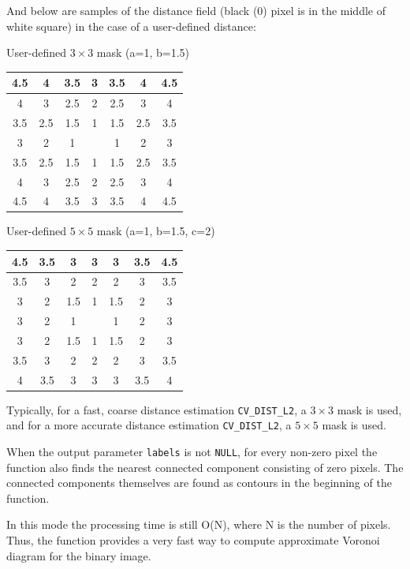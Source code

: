 And below are samples of the distance field (black (0) pixel is in the middle of white square) in the case of a user-defined distance:

User-defined $3 \times 3$ mask (a=1, b=1.5)

\begin{tabular}{| c | c | c | c | c | c | c |}
\hline
4.5 & 4 & 3.5 & 3 & 3.5 & 4 & 4.5\\ \hline
4 & 3 & 2.5 & 2 & 2.5 & 3 & 4\\ \hline
3.5 & 2.5 & 1.5 & 1 & 1.5 & 2.5 & 3.5\\ \hline
3 & 2 & 1 &     & 1 & 2 & 3\\ \hline
3.5 & 2.5 & 1.5 & 1 & 1.5 & 2.5 & 3.5\\ \hline
4 & 3 & 2.5 & 2 & 2.5 & 3 & 4\\ \hline
4.5 & 4 & 3.5 & 3 & 3.5 & 4 & 4.5\\ \hline
\end{tabular}

User-defined $5 \times 5$ mask (a=1, b=1.5, c=2)

\begin{tabular}{| c | c | c | c | c | c | c |}
\hline
4.5 & 3.5 & 3 & 3 & 3 & 3.5 & 4.5\\ \hline
3.5 & 3 & 2 & 2 & 2 & 3 & 3.5\\ \hline
3 & 2 & 1.5 & 1 & 1.5 & 2 & 3\\ \hline
3 & 2 & 1 & & 1 & 2 & 3\\ \hline
3 & 2 & 1.5 & 1 & 1.5 & 2 & 3\\ \hline
3.5 & 3 & 2 & 2 & 2 & 3 & 3.5\\ \hline
4 & 3.5 & 3 & 3 & 3 & 3.5 & 4\\ \hline
\end{tabular}


Typically, for a fast, coarse distance estimation \texttt{CV\_DIST\_L2},
a $3\times 3$ mask is used, and for a more accurate distance estimation
\texttt{CV\_DIST\_L2}, a $5\times 5$ mask is used.

When the output parameter \texttt{labels} is not \texttt{NULL}, for
every non-zero pixel the function also finds the nearest connected
component consisting of zero pixels. The connected components
themselves are found as contours in the beginning of the function.

In this mode the processing time is still O(N), where N is the number of
pixels. Thus, the function provides a very fast way to compute approximate
Voronoi diagram for the binary image.

